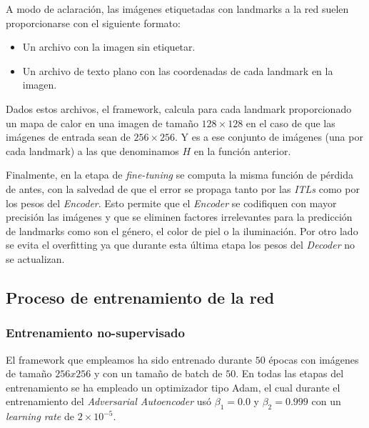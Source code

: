                 \medskip

                \noindent A modo de aclaración, las imágenes etiquetadas con landmarks a la red suelen proporcionarse con el siguiente formato: 

                \begin{itemize}
                    \item Un archivo con la imagen sin etiquetar. 
                    \item Un archivo de texto plano con las coordenadas de cada landmark en la imagen.
                \end{itemize}

                \noindent Dados estos archivos, el framework, calcula para cada landmark proporcionado un mapa de calor en una imagen de tamaño $128 \times 128$ en el caso de que las imágenes de entrada sean de $256 \times 256$. Y es a ese conjunto de imágenes (una por cada landmark) a las que denominamos $H$ en la función anterior.

                \medskip

                \noindent Finalmente, en la etapa de \textit{fine-tuning} se computa la misma función de pérdida de antes, con la salvedad de que el error se propaga tanto por las \textit{ITLs} como por los pesos del \textit{Encoder}. Esto permite que el \textit{Encoder} se codifiquen con mayor precisión las imágenes y que se eliminen factores irrelevantes para la predicción de landmarks como son el género, el color de piel o la iluminación. Por otro lado se evita el overfitting ya que durante esta última etapa los pesos del \textit{Decoder} no se actualizan.
        
            \subsection{Proceso de entrenamiento de la red}

                \subsubsection*{Entrenamiento no-supervisado}
                    \noindent El framework que empleamos ha sido entrenado durante $50$ épocas con imágenes de tamaño $256x256$ y con un tamaño de batch de $50$. En todas las etapas del entrenamiento se ha empleado un optimizador tipo Adam, el cual durante el entrenamiento del \textit{Adversarial Autoencoder} usó $\beta_1=0.0$ y $\beta_2=0.999$ con un \textit{learning rate} de $2\times 10^{-5}$.

